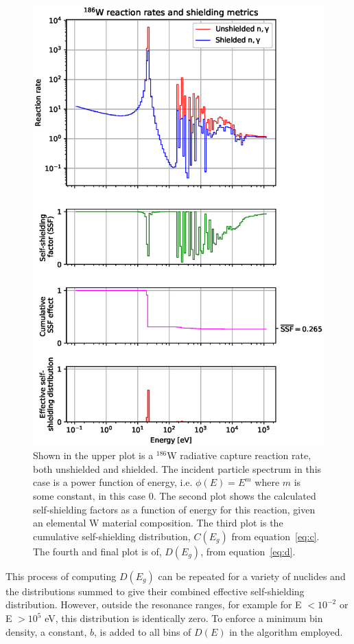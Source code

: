 \begin{figure}
  \centering
  \includegraphics[width=0.8\linewidth]{W186_gamma}
  \caption{Shown in the upper plot is a $^{186}$W radiative capture reaction rate, both unshielded and shielded. The incident particle spectrum in this case is a power function of energy, i.e. $\phi(E) = E^{m}$ where $m$ is some constant, in this case 0. The second plot shows the calculated self-shielding factors as a function of energy for this reaction, given an elemental W material composition. The third plot is the cumulative self-shielding distribution, $C(E_{g})$ from equation~\ref{eq:c}. The fourth and final plot is of, $D(E_{g})$, from equation~\ref{eq:d}.}
  \label{fig:w_cross_section}
\end{figure}

This process of computing $D(E_{g})$ can be repeated for a variety of nuclides and the distributions summed to give their combined effective self-shielding distribution. However, outside the resonance ranges, for example for E $< 10^{-2}$ or E $> 10^{5}$ eV, this distribution is identically zero. To enforce a minimum bin density, a constant, $b$, is added to all bins of $D(E)$ in the algorithm employed. 

